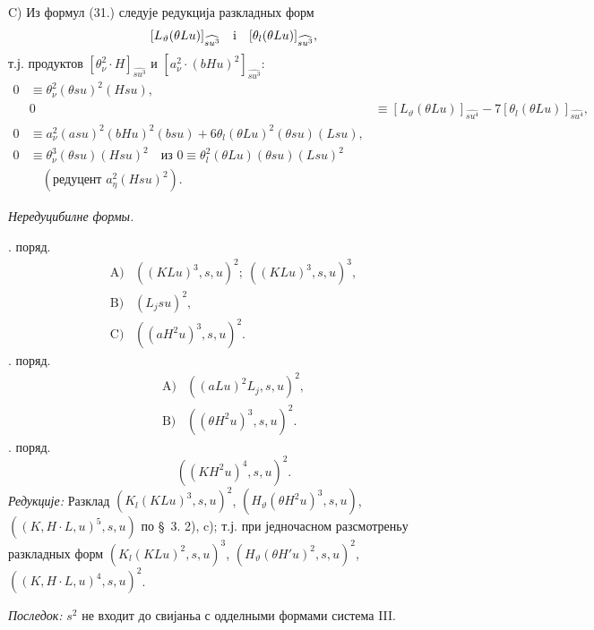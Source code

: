 ﻿\documentclass[11pt]{article}
\begin{document}
\mbox{C)} Из формул (31.) следује редукција разкладных форм
\[
 [L_\vartheta(\theta Lu)]_{\widehat{su^3}}\quad\hbox{i}\quad [\theta_l(\theta Lu)]_{\widehat{su^3}},
\]
т.ј. продуктов $[\theta_\nu^2\cdot H]_{\widehat{su^3}}$ и $[a_\nu^2\cdot(bHu)^2]_{\widehat{su^3}}$:
\begin{equation}
\tag{32}
\begin{aligned}
0&\equiv\theta_\nu^2(\theta su)^2(Hsu),\\
&0&\equiv [L_\vartheta(\theta Lu)]_{\widehat{su^4}}-7[\theta_l(\theta Lu)]_{\widehat{su^4}},\\
0&\equiv a_\nu^2(asu)^2(bHu)^2(bsu)+6\theta_l(\theta Lu)^2(\theta su)(Lsu),\\
0&\equiv\theta_\nu^3(\theta su)(Hsu)^2
\quad\text{из }0\equiv\theta_l^2(\theta Lu)(\theta su)(Lsu)^2\\
&\quad(\text{редуцент }a_\eta^2(Hsu)^2).
\end{aligned}
\end{equation}

\noindent\textit{Нередуцибилне формы.}

. поряд.
\[
\begin{array}{rl}
\mbox{A)}&((KLu)^3,s,u)^2;\ ((KLu)^3,s,u)^3,\\[0.25em]
\mbox{B)}&(L_jsu)^2,\\[0.25em]
\mbox{C)}&((aH^2u)^3,s,u)^2.
\end{array}
\]
. поряд.
\[
\begin{array}{rl}
\mbox{A)}&((aLu)^2L_j,s,u)^2,\\[0.25em]
\mbox{B)}&((\theta H^2u)^3,s,u)^2.
\end{array}
\]
. поряд.
\[
 ((KH^2u)^4,s,u)^2.
\]
\noindent\textit{Редукције:} Разклад $(K_l(KLu)^3,s,u)^2$, $(H_\vartheta(\theta H^2u)^3,s,u)$, $((K,H\cdot L,u)^5,s,u)$ по \S\ 3. \mbox{2)}, \mbox{c)}; т.ј. при једночасном разсмотреньу разкладных форм $(K_l(KLu)^2,s,u)^3$, $(H_\vartheta(\theta H'u)^2,s,u)^2$, $((K,H\cdot L,u)^4,s,u)^2$.

\noindent\textit{Последок:} $s^2$ не входит до свијаньа с одделными формами система III.
\end{document}
